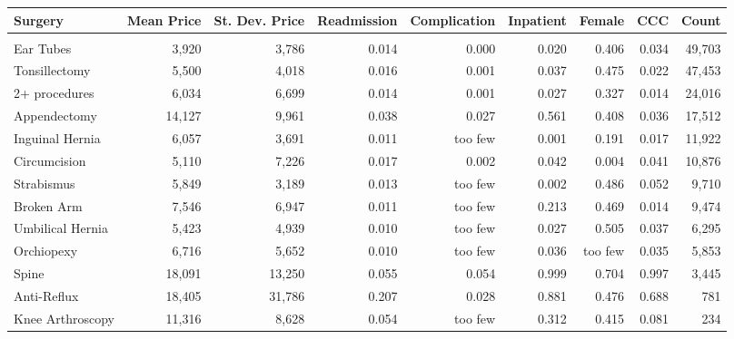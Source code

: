 \begin{table}[H]
\centering
\begin{tabular}{lrrrrrrrr}
\toprule
Surgery & Mean Price & St. Dev. Price & Readmission & Complication & Inpatient & Female & CCC & Count\\
\midrule
\addlinespace[0.3em]
\multicolumn{9}{l}{\textbf{Children's Hospitals}}\\
\hspace{1em}Ear Tubes & 3,920 & 3,786 & 0.014 & 0.000 & 0.020 & 0.406 & 0.034 & 49,703\\
\hspace{1em}Tonsillectomy & 5,500 & 4,018 & 0.016 & 0.001 & 0.037 & 0.475 & 0.022 & 47,453\\
\hspace{1em}2+ procedures & 6,034 & 6,699 & 0.014 & 0.001 & 0.027 & 0.327 & 0.014 & 24,016\\
\hspace{1em}Appendectomy & 14,127 & 9,961 & 0.038 & 0.027 & 0.561 & 0.408 & 0.036 & 17,512\\
\hspace{1em}Inguinal Hernia & 6,057 & 3,691 & 0.011 & too few & 0.001 & 0.191 & 0.017 & 11,922\\
\hspace{1em}Circumcision & 5,110 & 7,226 & 0.017 & 0.002 & 0.042 & 0.004 & 0.041 & 10,876\\
\hspace{1em}Strabismus & 5,849 & 3,189 & 0.013 & too few & 0.002 & 0.486 & 0.052 & 9,710\\
\hspace{1em}Broken Arm & 7,546 & 6,947 & 0.011 & too few & 0.213 & 0.469 & 0.014 & 9,474\\
\hspace{1em}Umbilical Hernia & 5,423 & 4,939 & 0.010 & too few & 0.027 & 0.505 & 0.037 & 6,295\\
\hspace{1em}Orchiopexy & 6,716 & 5,652 & 0.010 & too few & 0.036 & too few & 0.035 & 5,853\\
\hspace{1em}Spine & 18,091 & 13,250 & 0.055 & 0.054 & 0.999 & 0.704 & 0.997 & 3,445\\
\hspace{1em}Anti-Reflux & 18,405 & 31,786 & 0.207 & 0.028 & 0.881 & 0.476 & 0.688 & 781\\
\hspace{1em}Knee Arthroscopy & 11,316 & 8,628 & 0.054 & too few & 0.312 & 0.415 & 0.081 & 234\\

\end{tabular}
\end{table}
